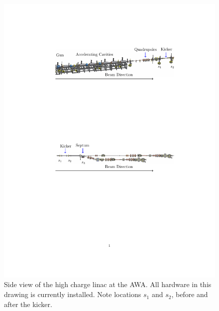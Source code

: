 \begin{figure}
\includegraphics[width=0.9\linewidth]{figures/awa-drawing}
	\caption{Side view of the high charge linac at the AWA. 
		All hardware in this drawing is currently installed. 
	Note locations $s_1$ and $s_2$, before and after the kicker.}
	\label{awa-linac}
\end{figure}

